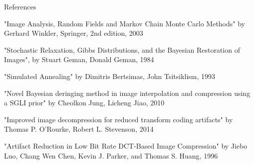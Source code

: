 \documentclass[10pt]{beamer}
\begin{document}
\begin{frame}{References}
\small{
"Image Analysis, Random Fields and Markov Chain Monte Carlo Methods" by Gerhard Winkler, Springer, 2nd edition, 2003

"Stochastic Relaxation, Gibbs Distributions, and the Bayesian Restoration of Images", by Stuart Geman, Donald Geman, 1984

"Simulated Annealing" by Dimitris Bertsimas, John Tsitsiklism, 1993

"Novel Bayesian deringing method in image interpolation and compression using a SGLI prior" by Cheolkon Jung, Licheng Jiao, 2010

"Improved image decompression for reduced transform coding artifacts" by Thomas P. O'Rourke, Robert L. Stevenson, 2014

"Artifact Reduction in Low Bit Rate DCT-Based Image Compression" by Jiebo Luo, Chang Wen Chen, Kevin J. Parker, and Thomas S. Huang, 1996
}
\end{frame}

\end{document}
